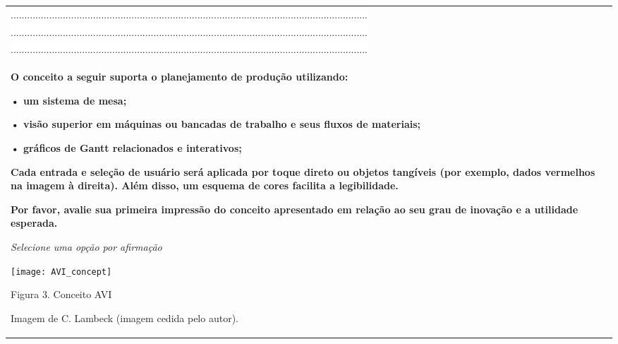 \begin{longtable}{|p{15.7cm}|}
	\colorbox{white}{ .................................................................................................................................. } \\
	\colorbox{white}{ .................................................................................................................................. } \\
	\colorbox{white}{ .................................................................................................................................. } \\
	\begin{Spacing}{0.4} \end{Spacing}
	\begin{Spacing}{1.4} 
		\textbf{O conceito a seguir suporta o planejamento de produção utilizando:}  \end{Spacing} 	
	\begin{Spacing}{1.4} 
		\textbf{• um sistema de mesa;} \end{Spacing} 	
	\begin{Spacing}{1.4} 
		\textbf{• visão superior em máquinas ou bancadas de trabalho e seus fluxos de materiais;} \end{Spacing} 	
	\begin{Spacing}{1.4} 
		\textbf{• gráficos de Gantt relacionados e interativos;} \end{Spacing} 	
	\begin{Spacing}{1.4} 
		\textbf{Cada entrada e seleção de usuário será aplicada por toque direto ou objetos tangíveis (por exemplo, dados vermelhos na imagem à direita). Além disso, um esquema de cores facilita a legibilidade.} \end{Spacing} 	
	\begin{Spacing}{1.4} 
		\textbf{Por favor, avalie sua primeira impressão do conceito apresentado em relação ao seu grau de inovação e a utilidade esperada.} \end{Spacing} 
	\begin{Spacing}{1.4} 
		\tiny \textit{Selecione uma opção por afirmação} \end{Spacing} 
	\begin{Spacing}{2.5} 
		\parbox[c]{1em}{\texttt{[image: AVI\_concept]}} 
	\end{Spacing} 
	\begin{Spacing}{1.2} 
		\hspace{6} Figura 3. Conceito AVI  
	\end{Spacing}
	\tiny \hspace{6} Imagem de C. Lambeck (imagem cedida pelo autor). \\

\end{longtable}
